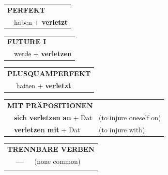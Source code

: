 \documentclass[10pt,a4paper]{revtex4-2}
\begin{document}
\begin{verbbox}
 \begin{tabular}{rl}
     \multicolumn{2}{l}{\textbf{PERFEKT}}\\
   & haben + \textbf{verletzt}\\
  \end{tabular}
\hfill
   \begin{tabular}{rl}
    \multicolumn{2}{l}{\textbf{FUTURE I} }\\
   & werde + \textbf{verletzen}\\
  \end{tabular}
\hfill
   \begin{tabular}{rl}
      \multicolumn{2}{l}{\textbf{PLUSQUAMPERFEKT}}\\
   & hatten + \textbf{verletzt}\\
  \end{tabular}

   \vspace{10pt}

   \begin{tabular}{lll}
      \multicolumn{3}{l}{\textbf{MIT PRÄPOSITIONEN}}\\
& \textbf{sich verletzen an} + Dat & (to injure oneself on)\\
& \textbf{verletzen mit} + Dat & (to injure with)\\
\end{tabular}
  \hfill
   \begin{tabular}{lll}
      \multicolumn{3}{l}{\textbf{TRENNBARE VERBEN}}\\
 & \textbf{---} & (none common)\\
\vspace{10pt}
  \end{tabular}

  \vspace{-5pt}

\end{verbbox}
\end{document}
